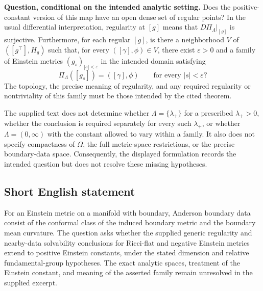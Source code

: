 \documentclass[11pt]{article}
\begin{document}
\textbf{Question, conditional on the intended analytic setting.} Does the positive-constant version of this map have an open dense set of regular points? In the usual differential interpretation, regularity at \([g]\) means that \(D\Pi_{\Lambda}|_{[g]}\) is surjective. Furthermore, for each regular \([g]\), is there a neighborhood \(V\) of \(([g^\top],H_g)\) such that, for every \(([\gamma],\phi)\in V\), there exist \(\varepsilon>0\) and a family of Einstein metrics \((g_s)_{|s|<\varepsilon}\) in the intended domain satisfying
\[
\Pi_{\Lambda}([g_s])=([\gamma],\phi)
\qquad\text{for every }|s|<\varepsilon?
\]
The topology, the precise meaning of regularity, and any required regularity or nontriviality of this family must be those intended by the cited theorem.

The supplied text does not determine whether \(\Lambda=\{\lambda_+\}\) for a prescribed \(\lambda_+>0\), whether the conclusion is required separately for every such \(\lambda_+\), or whether \(\Lambda=(0,\infty)\) with the constant allowed to vary within a family. It also does not specify compactness of \(\Omega\), the full metric-space restrictions, or the precise boundary-data space. Consequently, the displayed formulation records the intended question but does not resolve these missing hypotheses.
\subsection{Short English statement}
For an Einstein metric on a manifold with boundary, Anderson boundary data consist of the conformal class of the induced boundary metric and the boundary mean curvature. The question asks whether the supplied generic regularity and nearby-data solvability conclusions for Ricci-flat and negative Einstein metrics extend to positive Einstein constants, under the stated dimension and relative fundamental-group hypotheses. The exact analytic spaces, treatment of the Einstein constant, and meaning of the asserted family remain unresolved in the supplied excerpt.
\end{document}

